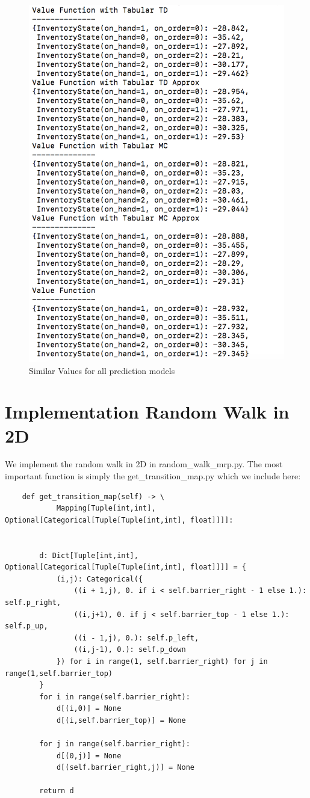 \documentclass{article}[12pt]
\begin{document}
\begin{figure}[h!]
  \includegraphics[width=0.5\linewidth]{scratch_values.png}
  \caption{Similar Values for all prediction models}
  \label{fig:optPol1}
\end{figure}


\section{Implementation Random Walk in 2D}

We implement the random walk in 2D in random\_walk\_mrp.py. The most important function is simply the get\_transition\_map.py which we include here:

\begin{lstlisting}
    def get_transition_map(self) -> \
            Mapping[Tuple[int,int], Optional[Categorical[Tuple[Tuple[int,int], float]]]]:


        d: Dict[Tuple[int,int], Optional[Categorical[Tuple[Tuple[int,int], float]]]] = {
            (i,j): Categorical({
                ((i + 1,j), 0. if i < self.barrier_right - 1 else 1.): self.p_right,
                ((i,j+1), 0. if j < self.barrier_top - 1 else 1.): self.p_up,
                ((i - 1,j), 0.): self.p_left,
                ((i,j-1), 0.): self.p_down
            }) for i in range(1, self.barrier_right) for j in range(1,self.barrier_top)
        }
        for i in range(self.barrier_right):
            d[(i,0)] = None
            d[(i,self.barrier_top)] = None

        for j in range(self.barrier_right):
            d[(0,j)] = None
            d[(self.barrier_right,j)] = None

        return d
\end{lstlisting}
\end{document}
